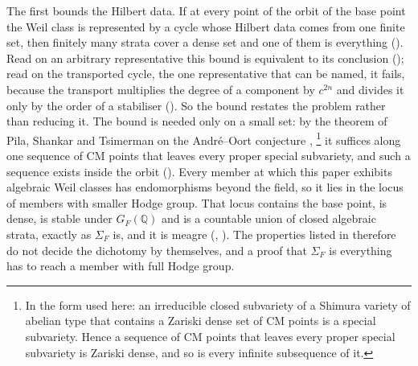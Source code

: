 \documentclass[11pt,reqno]{amsart}
\theoremstyle{plain}
\theoremstyle{definition}
\theoremstyle{remark}
\newcommand{\QQ}{\mathbb{Q}}
\begin{document}
The first bounds the Hilbert data. If at every point of the orbit of the
base point the Weil class is represented by a cycle whose Hilbert data comes
from one finite set, then finitely many strata cover a dense set and one of
them is everything (\cite[Theorem~16.9]{paperI}). Read on an arbitrary
representative this bound is equivalent to its conclusion
(\cite[Theorem~16.17]{paperI}); read on the transported cycle, the one
representative that can be named, it fails, because the transport multiplies
the degree of a component by $c^{2n}$ and divides it only by the order of a
stabiliser (\cite[Theorem~16.15]{paperI}). So the bound restates the problem rather
than reducing it.
The bound is needed only on a small set: by the theorem of Pila, Shankar
and Tsimerman on the Andr\'e--Oort conjecture \cite{PST},%
\footnote{In the form used here: an irreducible closed subvariety of a
Shimura variety of abelian type that contains a Zariski dense set of CM
points is a special subvariety. Hence a sequence of CM points that leaves
every proper special subvariety is Zariski dense, and so is every infinite
subsequence of it.}
it suffices along
one sequence of CM points that leaves every proper special subvariety, and
such a sequence exists inside the orbit (\cite[Theorem~17.14]{paperI}). Every
member at which this paper exhibits algebraic Weil classes has endomorphisms
beyond the field, so it lies in the locus of members with smaller Hodge
group. That locus contains the base point, is dense, is stable under
$G_{F}(\QQ)$ and is a countable union of closed algebraic strata, exactly as
$\Sigma_{F}$ is, and it is meagre (\cite[Proposition~17.12]{paperI},
\cite[Corollary~17.13]{paperI}). The properties listed in \cite[Theorem~1.1]{paperI} therefore
do not decide the dichotomy by themselves, and a proof that $\Sigma_{F}$ is
everything has to reach a member with full Hodge group.
\end{document}
